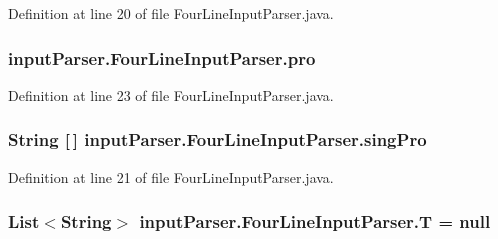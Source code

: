 Definition at line 20 of file Four\-Line\-Input\-Parser.\-java.

\hypertarget{classinput_parser_1_1_four_line_input_parser_ae0f524894f39d7a13bddd5e2efad8d3e}{
\subsubsection[{pro}]{ {\bf input\-Parser.\-Four\-Line\-Input\-Parser.\-pro}}}\label{classinput_parser_1_1_four_line_input_parser_ae0f524894f39d7a13bddd5e2efad8d3e}


Definition at line 23 of file Four\-Line\-Input\-Parser.\-java.

\hypertarget{classinput_parser_1_1_four_line_input_parser_a7a3bb0e55f839ba984d0953724ea385a}{
\subsubsection[{sing\-Pro}]{\setlength{\rightskip}{0pt plus 5cm}String \mbox{[}$\,$\mbox{]} {\bf input\-Parser.\-Four\-Line\-Input\-Parser.\-sing\-Pro}}}\label{classinput_parser_1_1_four_line_input_parser_a7a3bb0e55f839ba984d0953724ea385a}


Definition at line 21 of file Four\-Line\-Input\-Parser.\-java.

\hypertarget{classinput_parser_1_1_four_line_input_parser_ac5810e00377c73d3218c6c517676c5d4}{
\subsubsection[{T}]{\setlength{\rightskip}{0pt plus 5cm}List$<$String$>$ {\bf input\-Parser.\-Four\-Line\-Input\-Parser.\-T} = null}}\label{classinput_parser_1_1_four_line_input_parser_ac5810e00377c73d3218c6c517676c5d4}


